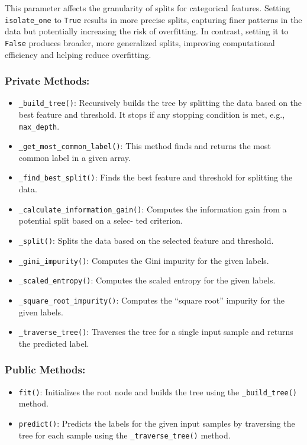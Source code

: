 \documentclass{article}
\begin{document}
This parameter affects the granularity of splits for categorical features. Setting \texttt{isolate\_one} to \texttt{True} results in more precise splits, capturing finer patterns in the data but potentially increasing the risk of overfitting. In contrast, setting it to \texttt{False} produces broader, more generalized splits, improving computational efficiency and helping reduce overfitting.

\subsubsection*{Private Methods:}
\begin{itemize}
    \item \texttt{\_build\_tree()}: Recursively builds the tree by splitting the data based on the best feature and threshold. It stops if any stopping condition is met, e.g., \texttt{max\_depth}.
\item \texttt{\_get\_most\_common\_label()}: This method finds and returns the most common label in a given array.
    \item \texttt{\_find\_best\_split()}: Finds the best feature and threshold for splitting the data.
    \item \texttt{\_calculate\_information\_gain()}: Computes the information gain from a potential split based on a selec- ted criterion.
    \item \texttt{\_split()}: Splits the data based on the selected feature and threshold.
    \item \texttt{\_gini\_impurity()}: Computes the Gini impurity for the given labels.
    \item \texttt{\_scaled\_entropy()}: Computes the scaled entropy for the given labels.
    \item \texttt{\_square\_root\_impurity()}: Computes the ``square root'' impurity for the given labels.
    \item \texttt{\_traverse\_tree()}: Traverses the tree for a single input sample and returns the predicted label.
\end{itemize}

\subsubsection*{Public Methods:}
\begin{itemize}
    \item \texttt{fit()}: Initializes the root node and builds the tree using the \texttt{\_build\_tree()} method.
    \item \texttt{predict()}: Predicts the labels for the given input samples by traversing the tree for each sample using the \texttt{\_traverse\_tree()} method.
\end{itemize}
\end{document}
